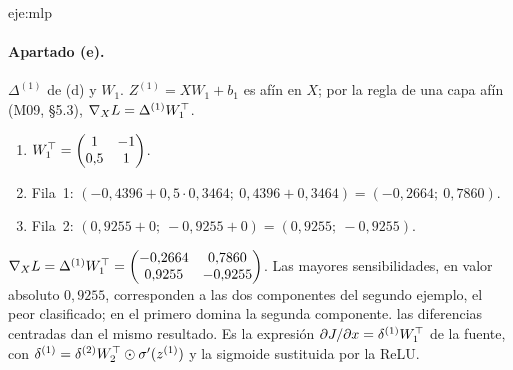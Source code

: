 \begin{solucion}{eje:mlp}
\paragraph{Apartado (e).}
\datos $\Delta^{(1)}$ de (d) y $W_1$.
\planteamiento $Z^{(1)}=XW_1+b_1$ es afín en $X$; por la regla de una capa afín (M09, §5.3), $\nabla_X L=\Delta^{(1)}W_1^{\top}$.
\pasos
\begin{enumerate}[label=\arabic*.]
  \item $W_1^{\top}=\begin{pmatrix}1&-1\\0{,}5&1\end{pmatrix}$.
  \item Fila~1: $(-0{,}4396+0{,}5\cdot 0{,}3464;\allowbreak\ 0{,}4396+0{,}3464)=(-0{,}2664;\allowbreak\ 0{,}7860)$.
  \item Fila~2: $(0{,}9255+0;\allowbreak\ -0{,}9255+0)=(0{,}9255;\allowbreak\ -0{,}9255)$.
\end{enumerate}
\resultado $\nabla_X L=\Delta^{(1)}W_1^{\top}=\begin{pmatrix}-0{,}2664&0{,}7860\\0{,}9255&-0{,}9255\end{pmatrix}$. Las mayores sensibilidades, en valor absoluto $0{,}9255$, corresponden a las dos componentes del segundo ejemplo, el peor clasificado; en el primero domina la segunda componente.
\comprobacion las diferencias centradas dan el mismo resultado. Es la expresión $\partial J/\partial x=\delta^{(1)}W_1^{\top}$ de la fuente, con $\delta^{(1)}=\delta^{(2)}W_2^{\top}\odot\sigma'(z^{(1)})$ y la sigmoide sustituida por la ReLU.


\end{solucion}
